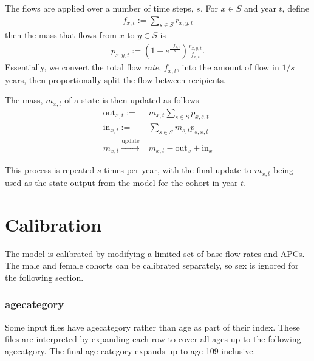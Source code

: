 \documentclass[]{article}
\begin{document}
	The flows are applied over a number of time steps, $s$. For $x \in S$ and year $t$, define
	\begin{align*}
		f_{x, t} := \sum_{s \in S} r_{x, y, t}
	\end{align*}
	then the mass that flows from $x$ to $y \in S$ is
	\begin{align*}
		p_{x, y, t} :=\left(1 - e^\frac{-f_{x, t}}{s}\right) \frac{r_{x, y, t}}{f_{x, t}}.
	\end{align*}
	Essentially, we convert the total flow \emph{rate}, $f_{x, t}$, into the amount of flow in $1/s$ years, then proportionally split the flow between recipients.
	
	The mass, $m_{x, t}$ of a state is then updated as follows
	\begin{align*}
		\text{out}_{x, t} :=& m_{x, t}\sum_{s \in S} p_{x, s, t} \\
		\text{in}_{x, t} :=& \sum_{s \in S}m_{s, t} p_{s,x, t} \\
		m_{x, t} \xrightarrow{\text{update}}& m_{x, t} - \text{out}_x + \text{in}_x
	\end{align*}
	
	This process is repeated $s$ times per year, with the final update to $m_{x, t}$ being used as the state output from the model for the cohort in year $t$.
	
	\section{Calibration}
	
	The model is calibrated by modifying a limited set of base flow rates and APCs. The male and female cohorts can be calibrated separately, so sex is ignored for the following section.
	
	\subsubsection{agecategory}\label{sec:agec}
	Some input files have agecategory rather than age as part of their index. These files are interpreted by expanding each row to cover all ages up to the following agecatgory. The final age category expands up to age 109 inclusive.
	
\end{document}
